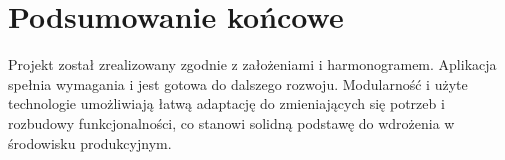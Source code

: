 \section{Podsumowanie końcowe}
Projekt został zrealizowany zgodnie z założeniami i harmonogramem. Aplikacja spełnia wymagania i jest gotowa do dalszego rozwoju. Modularność i użyte technologie umożliwiają łatwą adaptację do zmieniających się potrzeb i rozbudowy funkcjonalności, co stanowi solidną podstawę do wdrożenia w środowisku produkcyjnym.
